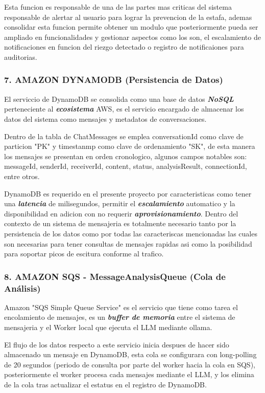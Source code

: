 Esta funcion es responsable de una de las partes mas criticas del sistema responsable de alertar al usuario para lograr la prevencion de la estafa, ademas consolidar esta funcion permite obtener un modulo que posteriormente pueda ser ampliado en funcionalidades y gestionar aspectos como los son, el escalamiento de notificaciones en funcion del riezgo detectado o registro de notificaiones para auditorias.

\subsubsection{7. AMAZON DYNAMODB (Persistencia de Datos)}

El serviccio de DynamoDB se consolida como una base de datos \textbf{\textit{NoSQL}} perteneciente al \textbf{\textit{ecosistema}} AWS, es el servicio encargado de almacenar los datos del sistema como mensajes y metadatos de conversaciones.

Dentro de la tabla de ChatMessages se emplea conversationId como clave de particion "PK" y timestanmp como clave de ordenamiento "SK", de esta manera los mensajes se presentan en orden cronologico, algunos campos notables son: messageId, senderId, receiverId, content, status, analysisResult, connectionId, entre otros.

DynamoDB es requerido en el presente proyecto por caracteristicas como 
tener una \textbf{\textit{latencia}} de milisegundos, permitir el \textbf{\textit{escalamiento}} automatico y la disponibilidad en adicion con no requerir \textbf{\textit{aprovisionamiento}}. Dentro del contexto de un sistema de mensajeria es totalmente necesario tanto por la persistencia de los datos como por todas las caracteriscas mencionadas las cuales son necesarias para tener consultas de mensajes rapidas asi como la posibilidad para soportar picos de escitura conforme al trafico.

\subsubsection{8. AMAZON SQS - MessageAnalysisQueue (Cola de Análisis)}

Amazon "SQS Simple Queue Service" es el servicio que tiene como tarea el encolamiento de mensajes, es un \textbf{\textit{buffer de memoria}} entre el sistema de mensajeria y el Worker local que ejecuta el LLM mediante ollama.

El flujo de los datos respecto a este servicio inicia despues de hacer sido almacenado un mensaje en DynamoDB, esta cola se configurara con long-polling de 20 segundos (periodo de consulta por parte del worker hacia la cola en SQS), posteriormente el worker procesa cada mensajes mediante el LLM, y los elimina de la cola tras actualizar el estatus en el registro de DynamoDB.

